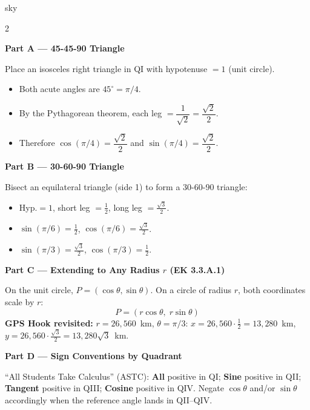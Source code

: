 \documentclass[10pt]{article}
\begin{document}
\begin{skillbox}[Lesson]{sky}
\begin{multicols}{2}

\textbf{Part A --- 45-45-90 Triangle}

Place an isosceles right triangle in QI with hypotenuse $= 1$ (unit circle).
\begin{itemize}
  \item Both acute angles are $45^\circ = \pi/4$.
  \item By the Pythagorean theorem, each leg $= \dfrac{1}{\sqrt{2}} = \dfrac{\sqrt{2}}{2}$.
  \item Therefore $\cos(\pi/4) = \dfrac{\sqrt{2}}{2}$ and $\sin(\pi/4) = \dfrac{\sqrt{2}}{2}$.
\end{itemize}

\columnbreak

\textbf{Part B --- 30-60-90 Triangle}

Bisect an equilateral triangle (side 1) to form a 30-60-90 triangle:
\begin{itemize}
  \item Hyp.$= 1$, short leg $= \tfrac{1}{2}$, long leg $= \tfrac{\sqrt{3}}{2}$.
  \item $\sin(\pi/6) = \tfrac{1}{2}$, $\cos(\pi/6) = \tfrac{\sqrt{3}}{2}$.
  \item $\sin(\pi/3) = \tfrac{\sqrt{3}}{2}$, $\cos(\pi/3) = \tfrac{1}{2}$.
\end{itemize}

\end{multicols}

\medskip
\textbf{Part C --- Extending to Any Radius $r$ (EK 3.3.A.1)}

On the unit circle, $P = (\cos\theta, \sin\theta)$. On a circle of radius $r$, both coordinates scale by $r$:
\[
  P = (r\cos\theta,\; r\sin\theta)
\]
\textbf{GPS Hook revisited:} $r = 26{,}560$~km, $\theta = \pi/3$:
\quad $x = 26{,}560\cdot\tfrac{1}{2} = 13{,}280$~km,
\quad $y = 26{,}560\cdot\tfrac{\sqrt{3}}{2} = 13{,}280\sqrt{3}$~km.

\medskip
\textbf{Part D --- Sign Conventions by Quadrant}

``All Students Take Calculus'' (ASTC): \textbf{All} positive in QI; \textbf{Sine} positive in QII; \textbf{Tangent} positive in QIII; \textbf{Cosine} positive in QIV. Negate $\cos\theta$ and/or $\sin\theta$ accordingly when the reference angle lands in QII--QIV.
\end{skillbox}
\vspace{6pt}
\end{document}
